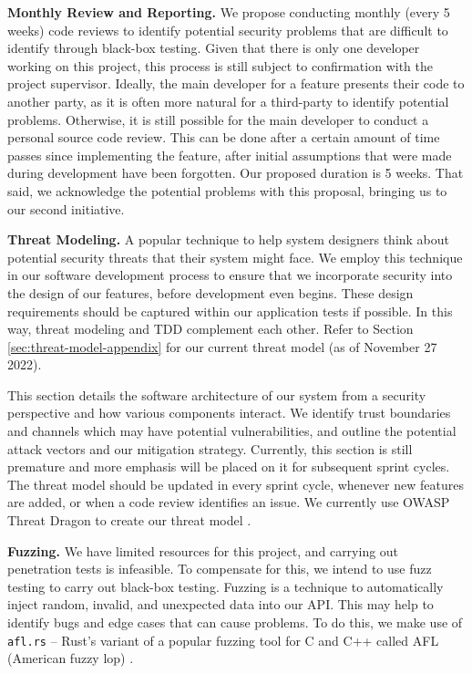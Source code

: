 \textbf{Monthly Review and Reporting.} We propose conducting monthly (every 5 weeks) code reviews to identify potential security problems that are difficult to identify through black-box testing. Given that there is only one developer working on this project, this process is still subject to confirmation with the project supervisor. Ideally, the main developer for a feature presents their code to another party, as it is often more natural for a third-party to identify potential problems. Otherwise, it is still possible for the main developer to conduct a personal source code review. This can be done after a certain amount of time passes since implementing the feature, after initial assumptions that were made during development have been forgotten. Our proposed duration is 5 weeks. That said, we acknowledge the potential problems with this proposal, bringing us to our second initiative. 

\textbf{Threat Modeling.} A popular technique to help system designers think about potential security threats that their system might face. We employ this technique in our software development process to ensure that we incorporate security into the design of our features, before development even begins. These design requirements should be captured within our application tests if possible. In this way, threat modeling and TDD complement each other. Refer to Section \ref{sec:threat-model-appendix} for our current threat model (as of November 27 2022). 
    
This section details the software architecture of our system from a security perspective and how various components interact. We identify trust boundaries and channels which may have potential vulnerabilities, and outline the potential attack vectors and our mitigation strategy. Currently, this section is still premature and more emphasis will be placed on it for subsequent sprint cycles. The threat model should be updated in every sprint cycle, whenever new features are added, or when a code review identifies an issue. We currently use OWASP Threat Dragon to create our threat model \cite{OWASP-Dragonv1.6}. 


\textbf{Fuzzing.} We have limited resources for this project, and carrying out penetration tests is infeasible. To compensate for this, we intend to use fuzz testing to carry out black-box testing. Fuzzing is a technique to automatically inject random, invalid, and unexpected data into our API. This may help to identify bugs and edge cases that can cause problems. To do this, we make use of \texttt{afl.rs} \cite{AFL-Rust} -- Rust's variant of a popular fuzzing tool for C and C++ called AFL (American fuzzy lop) \cite{AFL}.

